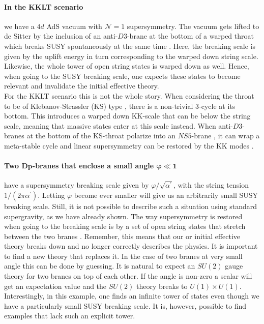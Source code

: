 \documentclass[a4paper,12pt,twoside,openright]{report}
\begin{document}
\paragraph{In the KKLT scenario} we have a $4d$ AdS vacuum with $\mathcal{N}=1$ supersymmetry. The vacuum gets lifted to de Sitter by the inclusion of an anti-$D3$-brane at the bottom of a warped throat which breaks SUSY spontaneously at the same time \cite{Kachru:2003aw,Kachru:2003sx}. Here, the breaking scale is given by the uplift energy in turn corresponding to the warped down string scale. Likewise, the whole tower of open string states is warped down as well. Hence, when going to the SUSY breaking scale, one expects these states to become relevant and invalidate the initial effective theory.\\
For the KKLT scenario this is not the whole story. When considering the throat to be of Klebanov-Strassler (KS) type \cite{Klebanov:2000hb}, there is a non-trivial 3-cycle at its bottom. This introduces a warped down KK-scale that can be below the string scale, meaning that massive states enter at this scale instead. When anti-$D3$-branes at the bottom of the KS-throat polarize into an $NS5$-brane \cite{Kachru:2002gs}, it can wrap a meta-stable cycle and linear supersymmetry can be restored by the KK modes \cite{Aalsma:2018pll}.
\paragraph{Two $\mathbf{Dp}$-branes that enclose a small angle $\mathbf{\varphi \ll 1}$} have a supersymmetry breaking scale given by $\varphi/\sqrt{\alpha^\prime}$, with the string tension $1/(2\pi \alpha^\prime)$. Letting $\varphi$ become ever smaller will give us an arbitrarily small SUSY breaking scale. Still, it is not possible to describe such a situation using standard supergravity, as we have already shown. The way supersymmetry is restored when going to the breaking scale is by a set of open string states that stretch between the two branes \cite{Berkooz:1996km,Anastasopoulos:2011hj,Anastasopoulos:2016cmg}. Remember, this means that our or initial effective theory breaks down and no longer correctly describes the physics. It is important to find a new theory that replaces it. In the case of two branes at very small angle this can be done by guessing. It is natural to expect an $SU(2)$ gauge theory for two branes on top of each other. If the angle is non-zero a scalar will get an expectation value and the $SU(2)$ theory breaks to $U(1)\times U(1)$. Interestingly, in this example, one finds an infinite tower of states even though we have a particularly small SUSY breaking scale. It is, however, possible to find examples that lack such an explicit tower.
\end{document}
